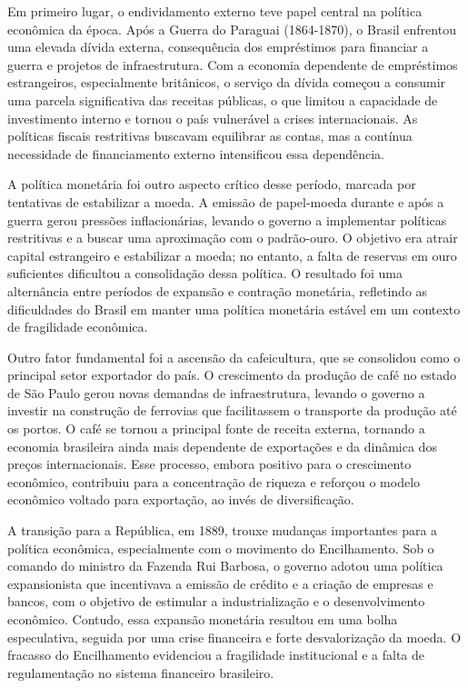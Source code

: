 \documentclass[a4paper,12pt]{article}[abntex2]
\begin{document}
Em primeiro lugar, o endividamento externo teve papel central na política econômica da época. Após a Guerra do Paraguai (1864-1870), o Brasil enfrentou uma elevada dívida externa, consequência dos empréstimos para financiar a guerra e projetos de infraestrutura. Com a economia dependente de empréstimos estrangeiros, especialmente britânicos, o serviço da dívida começou a consumir uma parcela significativa das receitas públicas, o que limitou a capacidade de investimento interno e tornou o país vulnerável a crises internacionais. As políticas fiscais restritivas buscavam equilibrar as contas, mas a contínua necessidade de financiamento externo intensificou essa dependência.

A política monetária foi outro aspecto crítico desse período, marcada por tentativas de estabilizar a moeda. A emissão de papel-moeda durante e após a guerra gerou pressões inflacionárias, levando o governo a implementar políticas restritivas e a buscar uma aproximação com o padrão-ouro. O objetivo era atrair capital estrangeiro e estabilizar a moeda; no entanto, a falta de reservas em ouro suficientes dificultou a consolidação dessa política. O resultado foi uma alternância entre períodos de expansão e contração monetária, refletindo as dificuldades do Brasil em manter uma política monetária estável em um contexto de fragilidade econômica.

Outro fator fundamental foi a ascensão da cafeicultura, que se consolidou como o principal setor exportador do país. O crescimento da produção de café no estado de São Paulo gerou novas demandas de infraestrutura, levando o governo a investir na construção de ferrovias que facilitassem o transporte da produção até os portos. O café se tornou a principal fonte de receita externa, tornando a economia brasileira ainda mais dependente de exportações e da dinâmica dos preços internacionais. Esse processo, embora positivo para o crescimento econômico, contribuiu para a concentração de riqueza e reforçou o modelo econômico voltado para exportação, ao invés de diversificação.

A transição para a República, em 1889, trouxe mudanças importantes para a política econômica, especialmente com o movimento do Encilhamento. Sob o comando do ministro da Fazenda Rui Barbosa, o governo adotou uma política expansionista que incentivava a emissão de crédito e a criação de empresas e bancos, com o objetivo de estimular a industrialização e o desenvolvimento econômico. Contudo, essa expansão monetária resultou em uma bolha especulativa, seguida por uma crise financeira e forte desvalorização da moeda. O fracasso do Encilhamento evidenciou a fragilidade institucional e a falta de regulamentação no sistema financeiro brasileiro.
\end{document}
